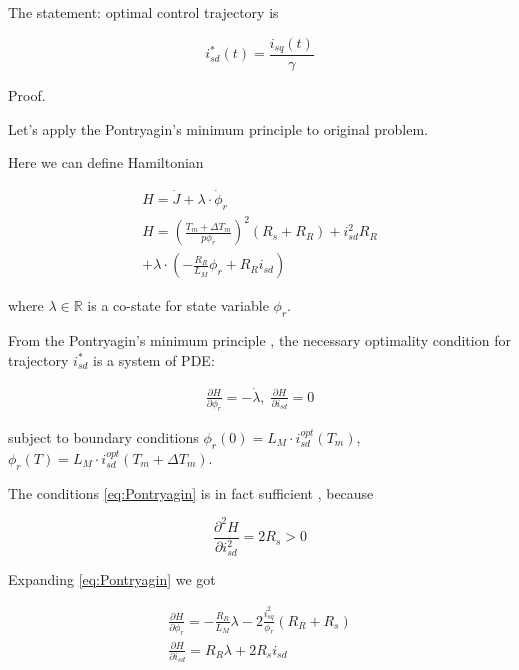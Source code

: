 \documentclass[journal]{IEEEtran}
\newcommand{\R}{\mathbb{R}}
\begin{document}
The statement: optimal control trajectory is 

\begin{equation}\label{eq:optimal_control}
i_{sd}^*(t) = \frac{i_{sq}(t)}{\gamma}
\end{equation}

Proof.

Let's apply the Pontryagin's minimum principle to original problem.

Here we can define Hamiltonian

\begin{equation}\label{eq:Hamiltonian}
\begin{gathered}
H = \dot J + \lambda \cdot \dot \phi_r \\
H = \left ( \frac{T_m+\Delta T_m}{p \phi_r} \right )^2 (R_s + R_R) + i_{sd}^2 R_R \\
+ \lambda \cdot \left ( -\frac{R_R}{L_M} \phi_r + R_R i_{sd} \right ) 
\end{gathered}
\end{equation}

where $\lambda \in \R$ is a co-state for state variable $\phi_r$.

From the Pontryagin's minimum principle \cite{9}, the necessary optimality condition for trajectory $i_{sd}^*$ is a system of PDE:

\begin{equation}\label{eq:Pontryagin}
\begin{gathered}
 \frac{\partial H}{\partial \phi_r} = - \dot \lambda, \; \frac{\partial H}{\partial i_{sd}} = 0 
\end{gathered}
\end{equation}

subject to boundary conditions $\phi_r(0) = L_M \cdot i_{sd}^{opt}(T_m)$, $\phi_r(T) = L_M \cdot i_{sd}^{opt}(T_m+\Delta T_m)$. 

The conditions \eqref{eq:Pontryagin} is in fact sufficient \cite{9}, because

\begin{equation}
\frac{\partial^2 H}{\partial i_{sd}^2} =  2 R_s > 0
\end{equation}

Expanding \eqref{eq:Pontryagin} we got

\begin{equation}
\begin{gathered}
 \frac{\partial H}{\partial \phi_r} = - \frac{R_R}{L_M} \lambda - 2 \frac{i_{sq}^2}{\phi_r} (R_R + R_s) \\
 \frac{\partial H}{\partial i_{sd}} = R_R \lambda + 2 R_s i_{sd}
\end{gathered}
\end{equation}
\end{document}
